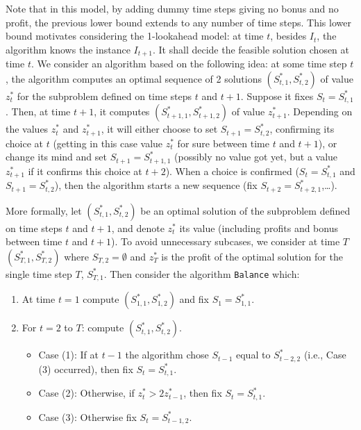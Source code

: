 \documentclass[a4paper]{book}
\begin{document}
Note that in this model, by adding dummy time steps giving no bonus and no profit, the previous lower bound extends to any number of time steps.
This lower bound motivates considering the 1-lookahead model: at time $t$, besides $I_t$, the algorithm knows the instance $I_{t+1}$. It shall decide the feasible solution chosen at time $t$. We consider an algorithm based on the following idea: at some time step $t$, the algorithm computes an optimal sequence of 2 solutions  $(S_{t,1}^*,S_{t,2}^*)$ of value $z^*_t$ for the subproblem defined on time steps $t$ and $t+1$. Suppose it fixes $S_t=S_{t,1}^*$. Then, at time $t+1$, it computes $(S_{t+1,1}^*,S_{t+1,2}^*)$ of value $z^*_{t+1}$. Depending on the values $z^*_t$ and $z^*_{t+1}$, it will either choose to  set $S_{t+1}=S^*_{t,2}$, confirming its choice at $t$ (getting in this case value $z^*_t$ for sure between time $t$ and $t+1$), or change its mind and set $S_{t+1}=S^*_{t+1,1}$ (possibly no value got yet, but a value $z^*_{t+1}$ if it confirms this choice at $t+2$). When a choice is confirmed ($S_t=S_{t,1}^*$ and $S_{t+1}=S_{t,2}^*$), then the algorithm starts a new sequence (fix $S_{t+2}=S^*_{t+2,1}$,\dots).

More formally, let $(S_{t,1}^*,S_{t,2}^*)$ be an optimal solution of the subproblem defined on time steps $t$ and $t+1$, and denote $z^*_t$ its value (including profits and bonus between time $t$ and $t+1$). To avoid unnecessary subcases, we consider at time $T$ $(S_{T,1}^*,S_{T,2}^*)$ where $S_{T,2}=\emptyset$ and $z^*_T$ is the profit of the optimal solution for the single time step $T$, $S_{T,1}^*$. Then consider the algorithm \texttt{Balance} which:

\begin{enumerate}
    \item At time $t=1$ compute $(S_{1,1}^*,S_{1,2}^*)$ and fix $S_1=S_{1,1}^*$.
    \item For $t=2$ to $T$: compute $(S_{t,1}^*,S_{t,2}^*)$.
    \begin{itemize}
        \item Case (1): If at $t-1$ the algorithm chose $S_{t-1}$ equal to $S_{t-2,2}^*$ (i.e., Case (3) occurred), then fix $S_t=S_{t,1}^*$.
        \item Case (2): Otherwise, if $z^*_t>2 z^*_{t-1}$, then fix $S_t=S^*_{t,1}$. 
        \item Case (3): Otherwise fix $S_t=S_{t-1,2}^*$.
    \end{itemize}
    
\end{enumerate}
\end{document}
